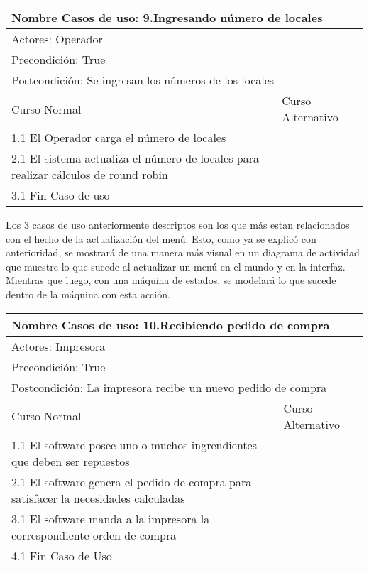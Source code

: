 \documentclass[a4paper,10pt]{article}
\begin{document}
\bigskip

\begin{center}
\begin{tabularx}{14cm}{|X|X|}
\hline
\multicolumn{2}{|l|}{Nombre Casos de uso: 9.Ingresando n\'umero de locales}\\
\hline
\multicolumn{2}{|l|}{Actores: Operador}\\
\hline
\multicolumn{2}{|l|}{Precondici\'on: True}\\
\hline
\multicolumn{2}{|l|}{Postcondici\'on: Se ingresan los n\'umeros de los locales}\\
\hline
Curso Normal & Curso Alternativo\\
\hline
1.1 El Operador carga el n\'umero de locales & 
\\
\hline
2.1 El sistema actualiza el n\'umero de locales para realizar c\'alculos de round robin & 
\\
\hline
3.1 Fin Caso de uso &
\\
\hline
\end{tabularx}
\end{center}

\bigskip

Los 3 casos de uso anteriormente descriptos son los que m\'as estan relacionados con el hecho de la actualizaci\'on del men\'u. Esto, como ya se
explic\'o con anterioridad, se mostrar\'a de una manera m\'as visual en un diagrama de actividad que muestre lo que sucede al actualizar un men\'u
en el mundo y en la interfaz. Mientras que luego, con una m\'aquina de estados, se modelar\'a lo que sucede dentro de la m\'aquina con esta acci\'on.

\bigskip

\begin{center}
\begin{tabularx}{14cm}{|X|X|}
\hline
\multicolumn{2}{|l|}{Nombre Casos de uso: 10.Recibiendo pedido de compra}\\
\hline
\multicolumn{2}{|l|}{Actores: Impresora}\\
\hline
\multicolumn{2}{|l|}{Precondici\'on: True}\\
\hline
\multicolumn{2}{|l|}{Postcondici\'on: La impresora recibe un nuevo pedido de compra}\\
\hline
Curso Normal & Curso Alternativo\\
\hline
1.1 El software posee uno o muchos ingrendientes que deben ser repuestos & 
\\
\hline
2.1 El software genera el pedido de compra para satisfacer la necesidades calculadas & 
\\
\hline
3.1 El software manda a la impresora la correspondiente orden de compra &
\\
\hline
4.1 Fin Caso de Uso &
\\
\hline
\end{tabularx}
\end{center}
\end{document}
